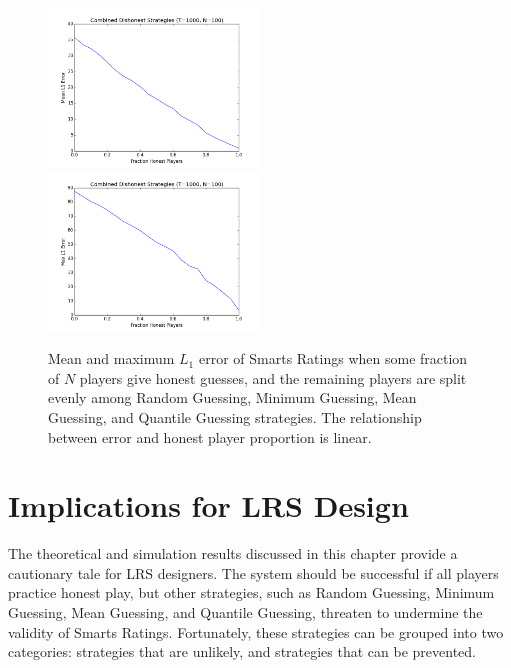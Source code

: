 \begin{figure}[H]
\centerline{%
\includegraphics[width=0.5\textwidth]{figures/robustness/Combined_Dishonest_Strategies31.png}
\includegraphics[width=0.5\textwidth] {figures/robustness/Combined_Dishonest_Strategies32.png}%
}%
\caption{Mean and maximum $L_1$ error of Smarts Ratings when some fraction of $N$ players give honest guesses, and the remaining players are split evenly among Random Guessing, Minimum Guessing, Mean Guessing, and Quantile Guessing strategies. The relationship between error and honest player proportion is linear.}
\label{fig:Combined}
\end{figure}
\section{Implications for LRS Design}

The theoretical and simulation results discussed in this chapter provide a cautionary tale for LRS designers. The system should be successful if all players practice honest play, but other strategies, such as Random Guessing, Minimum Guessing, Mean Guessing, and Quantile Guessing, threaten to undermine the validity of Smarts Ratings. Fortunately, these strategies can be grouped into two categories: strategies that are unlikely, and strategies that can be prevented. 

